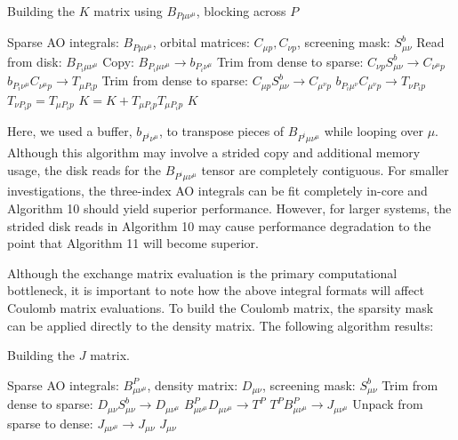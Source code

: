 \begin{algorithm}[H]
\caption{Building the $K$ matrix using $B_{P \mu \nu^\mu}$, blocking across $P$}
\begin{algorithmic}
\REQUIRE Sparse AO integrals: $B_{P \mu \nu^\mu}$, orbital matrices: $C_{\mu p}, C_{\nu p}$, screening mask: $S_{\mu \nu}^b$
    \STATE Read from disk: $B_{P_i \mu \nu^{\mu}}$
        \STATE Copy: $B_{P_i \mu \nu^{\mu}} \rightarrow b_{P_i \nu^{\mu}}$
        \STATE Trim from dense to sparse: $C_{\nu p}S_{\mu \nu}^b \rightarrow C_{\nu^{\mu} p}$
        \STATE $b_{P_i \nu^{\mu}} C_{\nu^{\mu} p} \rightarrow T_{\mu P_i p}$
            \STATE Trim from dense to sparse: $C_{\mu p}S_{\mu \nu}^b \rightarrow C_{\mu^{\nu} p}$
            \STATE $b_{P_i \mu^{\nu}} C_{\mu^{\nu} p} \rightarrow T_{\nu P_i p}$
        \ELSE
            \STATE $T_{\nu P_i p} = T_{\mu P_i p}$ 
        \ENDIF
    \ENDFOR
    \STATE $K = K +  T_{\mu P_i p} T_{\mu P_i p} $
\ENDFOR
\RETURN $K$
\end{algorithmic}
\end{algorithm}

\noindent Here, we used a buffer, $b_{P^i \nu^{\mu}}$, to transpose pieces of $B_{P^i \mu \nu^{\mu}}$ while looping over $\mu$.
Although this algorithm may involve a strided copy and additional memory usage, the disk reads for the $B_{P^i \mu \nu^{\mu}}$ 
tensor are completely contiguous. 
For smaller investigations, the three-index AO integrals can be fit completely in-core and Algorithm 10 should yield superior 
performance. However, for larger systems,
the strided disk reads in Algorithm 10 may cause performance degradation to the point that Algorithm 11 will become superior.

Although the exchange matrix evaluation is the primary computational bottleneck, it is important to note how the above integral
formats will affect Coulomb matrix evaluations. To build the Coulomb matrix, the sparsity mask can be applied
directly to the density matrix. The following algorithm results:

\begin{algorithm}[H]
\caption{Building the $J$ matrix.}
\begin{algorithmic}
\REQUIRE Sparse AO integrals: $B_{\mu \nu^{\mu}}^P$, density matrix: $D_{\mu \nu}$, screening mask: $S_{\mu \nu}^b$
\STATE Trim from dense to sparse: $D_{\mu \nu}S_{\mu \nu}^b \rightarrow D_{\mu \nu^{\mu} }$
\STATE $B^P_{\mu\nu^{\mu}} D_{\mu \nu^{\mu}} \rightarrow T^{P}$
\STATE $T^{P} B^P_{\mu \nu^{\mu}} \rightarrow J_{\mu \nu^{\mu}} $
\STATE Unpack from sparse to dense: $J_{\mu \nu^{\mu}} \rightarrow J_{\mu \nu}$
\RETURN $J_{\mu \nu}$
\end{algorithmic}
\end{algorithm}

